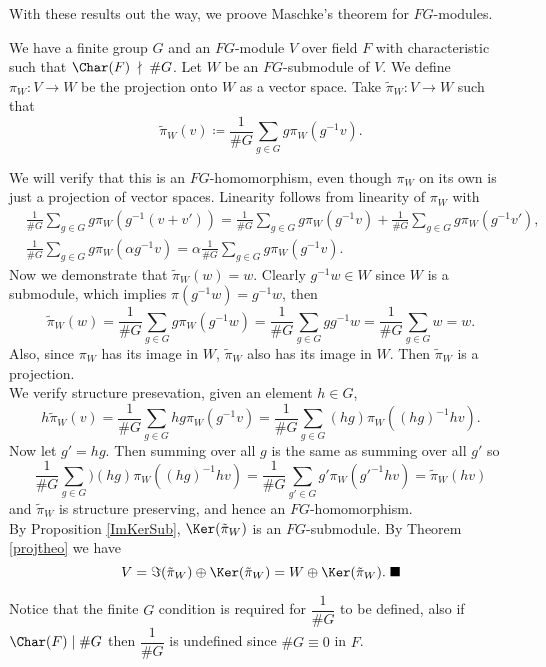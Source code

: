 \documentclass[../Project.tex]{subfiles}
\begin{document}
With these results out the way, we proove Maschke's theorem for $FG$-modules.
\begin{proo*}
	We have a finite group $G$ and an $FG$-module $V$ over field $F$ with characteristic such that $\Char(F)\;\nmid\;\#G$. Let $W$ be an $FG$-submodule of $V$. We define $\pi_W : V \to W$ be the projection onto $W$ as a vector space. Take $\tilde{\pi}_W : V \to W$ such that
	$$\tilde{\pi}_W(v) \coloneqq \frac{1}{\#G}\sum_{g \in G}g\pi_W(g^{-1}v).$$

	We will verify that this is an $FG$-homomorphism, even though $\pi_W$ on its own is just a projection of vector spaces. Linearity follows from linearity of $\pi_W$ with
	\begin{align*}
		&\frac{1}{\#G}\sum_{g \in G}g\pi_W(g^{-1}(v + v')) = \frac{1}{\#G}\sum_{g \in G}g\pi_W(g^{-1}v) + \frac{1}{\#G}\sum_{g \in G}g\pi_W(g^{-1}v'),\\
		&\frac{1}{\#G}\sum_{g \in G}g\pi_W(\alpha g^{-1}v) = \alpha\frac{1}{\#G}\sum_{g \in G}g\pi_W(g^{-1}v).
	\end{align*}
	 Now we demonstrate that $\tilde{\pi}_W(w) = w$. Clearly $g^{-1}w \in W$ since $W$ is a submodule, which implies $\pi(g^{-1}w) = g^{-1}w$, then
	$$\tilde{\pi}_W(w) = \frac{1}{\#G}\sum_{g \in G}g\pi_W(g^{-1}w) = \frac{1}{\#G}\sum_{g \in G}gg^{-1}w = \frac{1}{\#G}\sum_{g \in G}w = w.$$
	Also, since $\pi_W$ has its image in $W$, $\tilde{\pi}_W$ also has its image in $W$. Then $\tilde{\pi}_W$ is a projection.\\

	We verify structure presevation, given an element $h \in G$,
	$$h\tilde{\pi}_W(v) = \frac{1}{\#G}\sum_{g \in G}hg\pi_W(g^{-1}v) = \frac{1}{\#G}\sum_{g \in G}(hg)\pi_W((hg)^{-1}hv).$$
	Now let $g' = hg$. Then summing over all $g$ is the same as summing over all $g'$ so
	$$\frac{1}{\#G}\sum_{g \in G})(hg)\pi_W((hg)^{-1}hv) = \frac{1}{\#G}\sum_{g' \in G}g'\pi_W(g'^{-1}hv) = \tilde{\pi}_W(hv)$$
	and $\tilde{\pi}_W$ is structure preserving, and hence an $FG$-homomorphism.\\

	By Proposition \ref{ImKerSub}, $\Ker(\tilde{\pi}_W)$ is an $FG$-submodule. By Theorem \ref{projtheo} we have
	$$V = \Im(\tilde{\pi}_W) \oplus \Ker(\tilde{\pi}_W) = W \oplus \Ker(\tilde{\pi}_W). \;\blacksquare$$ 
	\end{proo*}
	
	Notice that the finite $G$ condition is required for $\dfrac{1}{\#G}$ to be defined, also if  $\Char(F) \mid \#G$ then $\dfrac{1}{\#G}$ is undefined since $\#G \equiv 0$ in $F$.\\
\end{document}
